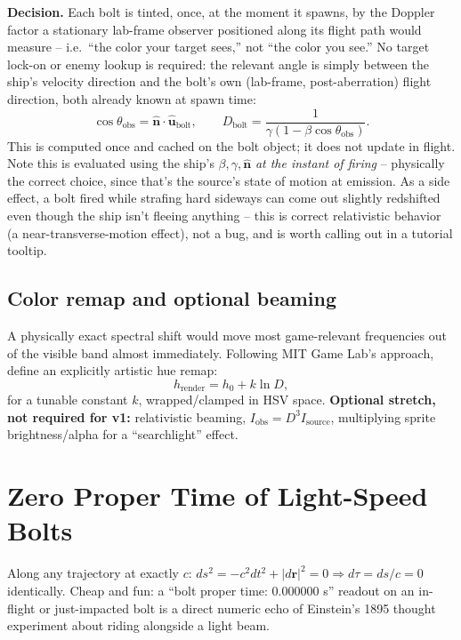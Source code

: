 \documentclass[11pt]{article}
\newcommand{\vb}[1]{\mathbf{#1}}
\newcommand{\uv}[1]{\hat{\mathbf{#1}}}
\newcommand{\decision}[1]{\par\smallskip\noindent\textbf{Decision.} #1\par\smallskip}
\begin{document}
\decision{Each bolt is tinted, once, at the moment it spawns, by the Doppler factor a stationary lab-frame observer positioned along its flight path would measure -- i.e.\ ``the color your target sees,'' not ``the color you see.'' No target lock-on or enemy lookup is required: the relevant angle is simply between the ship's velocity direction and the bolt's own (lab-frame, post-aberration) flight direction, both already known at spawn time:
\begin{equation}
  \cos\theta_{\text{obs}} = \uv n \cdot \uv u_{\text{bolt}}, \qquad D_{\text{bolt}} = \frac{1}{\gamma\left(1-\beta\cos\theta_{\text{obs}}\right)}.
  \label{eq:bolt-doppler}
\end{equation}
This is computed once and cached on the bolt object; it does not update in flight. Note this is evaluated using the ship's $\beta,\gamma,\uv n$ \emph{at the instant of firing} -- physically the correct choice, since that's the source's state of motion at emission. As a side effect, a bolt fired while strafing hard sideways can come out slightly redshifted even though the ship isn't fleeing anything -- this is correct relativistic behavior (a near-transverse-motion effect), not a bug, and is worth calling out in a tutorial tooltip.}

\subsection{Color remap and optional beaming}
A physically exact spectral shift would move most game-relevant frequencies out of the visible band almost immediately. Following MIT Game Lab's approach, define an explicitly artistic hue remap:
\begin{equation}
  h_{\text{render}} = h_0 + k\ln D,
\end{equation}
for a tunable constant $k$, wrapped/clamped in HSV space. \textbf{Optional stretch, not required for v1:} relativistic beaming, $I_{\text{obs}} = D^3 I_{\text{source}}$, multiplying sprite brightness/alpha for a ``searchlight'' effect.

\section{Zero Proper Time of Light-Speed Bolts}
\label{sec:zero-tau}

Along any trajectory at exactly $c$: $ds^2 = -c^2dt^2+|d\vb r|^2=0 \Rightarrow d\tau = ds/c = 0$ identically. Cheap and fun: a ``bolt proper time: 0.000000 s'' readout on an in-flight or just-impacted bolt is a direct numeric echo of Einstein's 1895 thought experiment about riding alongside a light beam.
\end{document}

